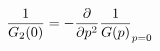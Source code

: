 \begin{equation}\label{b.7}
{1 \over G_2(0)}=-{\partial \over \partial p^2} {1 \over
G(p)}_{p=0}
\end{equation}

